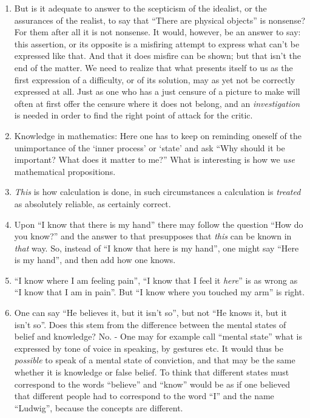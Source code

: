 \documentclass{book}
\begin{document}
\begin{enumerate}
\item
But is it adequate to answer to the scepticism of the idealist, or the
assurances of the realist, to say that ``There are physical objects'' is
nonsense? For them after all it is not nonsense. It would, however, be an
answer to say: this assertion, or its opposite is a misfiring attempt to
express what can't be expressed like that. And that it does misfire can be
shown; but that isn't the end of the matter. We need to realize that what
presents itself to us as the first expression of a difficulty, or of its
solution, may as yet not be correctly expressed at all. Just as one who has a
just censure of a picture to make will often at first offer the censure where
it does not belong, and an \emph{investigation} is needed in order to find the
right point of attack for the critic.

\item
Knowledge in mathematics: Here one has to keep on reminding oneself of the
unimportance of the `inner process' or `state' and ask ``Why should it be
important? What does it matter to me?'' What is interesting is how we
\emph{use} mathematical propositions.

\item
\emph{This} is how calculation is done, in such circumstances a calculation is
\emph{treated} as absolutely reliable, as certainly correct.

\item
Upon ``I know that there is my hand'' there may follow the question ``How do
you know?'' and the answer to that presupposes that \emph{this} can be known in
\emph{that} way. So, instead of ``I know that here is my hand'', one might say
``Here is my hand'', and then add how one knows.

\item
``I know where I am feeling pain'', ``I know that I feel it \emph{here}'' is as
wrong as ``I know that I am in pain''. But ``I know where you touched my arm''
is right.

\item
One can say ``He believes it, but it isn't so'', but not ``He knows it, but it
isn't so''. Does this stem from the difference between the mental states of
belief and knowledge? No. - One may for example call ``mental state'' what is
expressed by tone of voice in speaking, by gestures etc. It would thus be
\emph{possible} to speak of a mental state of conviction, and that may be the
same whether it is knowledge or false belief. To think that different states
must correspond to the words ``believe'' and ``know'' would be as if one
believed that different people had to correspond to the word ``I'' and the name
``Ludwig'', because the concepts are different.


\end{enumerate}
\end{document}
